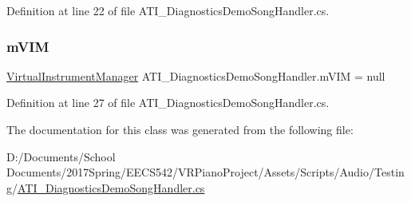 Definition at line 22 of file A\+T\+I\+\_\+\+Diagnostics\+Demo\+Song\+Handler.\+cs.

\mbox{\label{class_a_t_i___diagnostics_demo_song_handler_ac3a2216a6de2023d3dd19caa25de7d6f}} 
\subsubsection{\texorpdfstring{m\+V\+IM}{mVIM}}
{\footnotesize\ttfamily \hyperlink{class_virtual_instrument_manager}{Virtual\+Instrument\+Manager} A\+T\+I\+\_\+\+Diagnostics\+Demo\+Song\+Handler.\+m\+V\+IM = null\hspace{0.3cm}{\ttfamily [private]}}



Definition at line 27 of file A\+T\+I\+\_\+\+Diagnostics\+Demo\+Song\+Handler.\+cs.



The documentation for this class was generated from the following file\+:\begin{DoxyCompactItemize}
\item 
D\+:/\+Documents/\+School Documents/2017\+Spring/\+E\+E\+C\+S542/\+V\+R\+Piano\+Project/\+Assets/\+Scripts/\+Audio/\+Testing/\hyperlink{_a_t_i___diagnostics_demo_song_handler_8cs}{A\+T\+I\+\_\+\+Diagnostics\+Demo\+Song\+Handler.\+cs}\end{DoxyCompactItemize}

